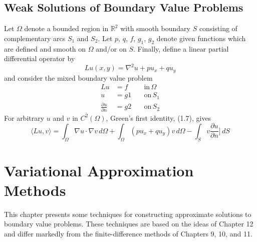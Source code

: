 \documentclass[11pt]{book}
\theoremstyle{example}
\theoremstyle{problem}
\theoremstyle{theorem}
\theoremstyle{definition}
\begin{document}
\section{Weak Solutions of Boundary Value Problems}
Let $\Omega$ denote a bounded region in $\mathbb{R}^2$ with smooth boundary $S$ consisting of complementary arcs $S_1$ and $S_2$. Let $p$, $q$, $f$, $g_1$, $g_2$ denote given functions which are defined and smooth on $\Omega$ and/or on $S$. Finally, define a linear partial differential operator by
\begin{equation}
	Lu(x,y)=\nabla^2u+pu_x+qu_y
\end{equation}
and consider the mixed boundary value problem
\begin{align}
	Lu&=f&\quad\mathrm{in}\,\Omega\\
	u&=g1&\quad\mathrm{on}\,S_1\\
	\frac{\partial u}{\partial n}&=g2&\quad\mathrm{on}\,S_2
\end{align}
For arbitrary $u$ and $v$ in $C^2(\Omega)$, Green's first identity, (1.7), gives
\begin{equation}
	\langle Lu,v\rangle=\int_\Omega{\mathbb{\nabla}u\cdot\mathbb{\nabla}v\,d\Omega}+\int_\Omega{(pu_x+qu_y)v\,d\Omega}-\int_S{v\frac{\partial u}{\partial n}]\,dS}
\end{equation}

\chapter{Variational Approximation Methods}
This chapter presents some techniques for constructing approximate solutions to boundary value problems. These techniques are based on the ideas of Chapter 12 and differ markedly from the finite-difference methods of Chapters 9, 10, and 11.
\end{document}
